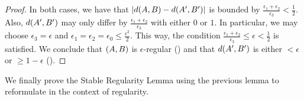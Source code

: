 \begin{lemma}
\begin{proof}
                In both cases, we have that $| d ( A,B ) - d ( A',B' ) |$ is bounded by
                $\frac{\epsilon_1 + \epsilon_2}{\epsilon_3} < \frac{1}{2}$.
                Also, $d ( A', B' )$ may only differ by $\frac{\epsilon_1 + \epsilon_2}{\epsilon_3}$ with either
                $0$ or $1$.
                In particular, we may choose $\epsilon_3 = \epsilon$ and $\epsilon_1 = \epsilon_2 = \epsilon_0 \leq \frac{\epsilon^2}{2}$.
                This way, the condition $\frac{\epsilon_1 + \epsilon_2}{\epsilon_3} \leq \epsilon < \frac{1}{2}$ is satisfied.
                We conclude that $( A,B )$ is $\epsilon$-regular () and that $d ( A',B' )$ is either
                $< \epsilon$ or $\geq 1 - \epsilon$ ().
            \end{proof}
        \end{lemma}

        We finally prove the Stable Regularity Lemma using the previous lemma to reformulate
         in the context of regularity.

